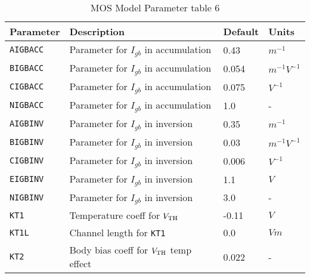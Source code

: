 \documentclass{article}
\begin{document}

\newpage
\begin{table}[H]
\begin{tabular}{|l |l |l |l |}
\hline
\textbf{Parameter} & \textbf{Description} & \textbf{Default} & \textbf{Units} \\
\hline
\texttt{AIGBACC} & Parameter for $I_{gb}$ in accumulation & 0.43 & $m^{-1}$\\
\texttt{BIGBACC} & Parameter for $I_{gb}$ in accumulation & 0.054 & $m^{-1} V^{-1}$\\
\texttt{CIGBACC} & Parameter for $I_{gb}$ in accumulation & 0.075 & $V^{-1}$\\
\texttt{NIGBACC} & Parameter for $I_{gb}$ in accumulation & 1.0 & - \\
\texttt{AIGBINV} & Parameter for $I_{gb}$ in inversion & 0.35 & $m^{-1}$\\
\texttt{BIGBINV} & Parameter for $I_{gb}$ in inversion & 0.03 & $m^{-1} V^{-1}$\\
\texttt{CIGBINV} & Parameter for $I_{gb}$ in inversion & 0.006 & $V^{-1}$\\
\texttt{EIGBINV} & Parameter for $I_{gb}$ in inversion & 1.1 & $V$ \\
\texttt{NIGBINV} & Parameter for $I_{gb}$ in inversion & 3.0 & - \\
\texttt{KT1}     & Temperature coeff for $V_{\rm{TH}}$ & -0.11 & $V$ \\
\texttt{KT1L}    & Channel length for \texttt{KT1} & 0.0 & $Vm$ \\
\texttt{KT2}     & Body bias coeff for $V_{\rm{TH}}$ temp effect & 0.022 & - \\
\hline
\end{tabular}
\caption{\label{bsim4.params6} MOS Model Parameter table 6}
\end{table}
\end{document}
